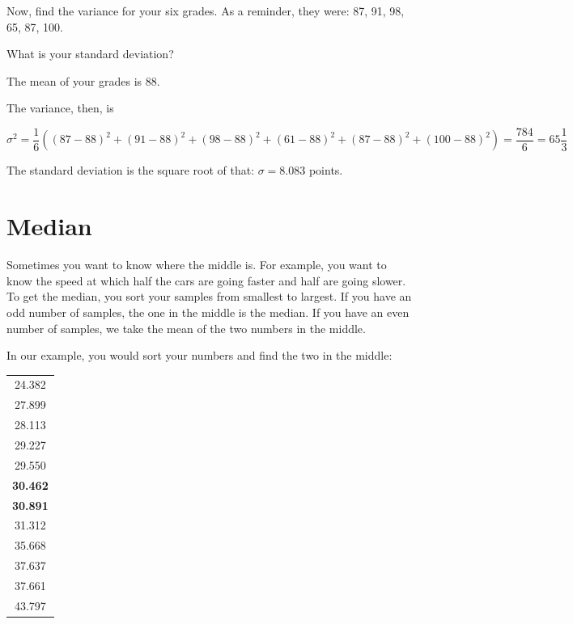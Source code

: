 \begin{Exercise}[title={Variance of Grades}, label=grades_variance]

  Now, find the variance for your six grades. As a reminder, they were: 87, 91, 98, 65, 87, 100.

  What is your standard deviation?

\end{Exercise}
\begin{Answer}[ref=grades_variance]

  The mean of your grades is $88$.

  The variance, then, is

  $$\sigma^2 = \frac{1}{6} \left((87 - 88)^2 + (91 - 88)^2 + (98 - 88)^2 + (61 - 88)^2 + (87 - 88)^2 + (100 - 88)^2 \right) = \frac{784}{6} = 65 \frac{1}{3}$$

  The standard deviation is the square root of that: $\sigma = 8.083$ points.
  
\end{Answer}


\section{Median}

Sometimes you want to know where the middle is. For example, you want
to know the speed at which half the cars are going faster and half are
going slower. To get the median, you sort your samples from smallest
to largest. If you have an odd number of samples, the one in the
middle is the median. If you have an even number of samples, we take
the mean of the two numbers in the middle.

In our example, you would sort your numbers and find the two in the middle:

\begin{tabular}{c}
24.382\\
27.899\\
28.113\\
29.227\\
29.550\\
\hline
\textbf{30.462}\\
\textbf{30.891}\\
\hline 
31.312\\
35.668\\
37.637\\
37.661\\
43.797\\
\end{tabular}

